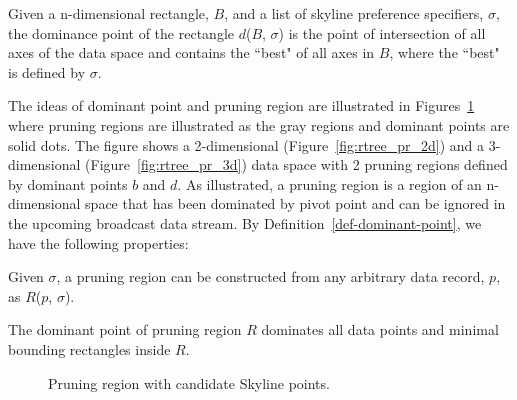 \begin{definition}\label{def-dominant-point}
Given a n-dimensional rectangle, $B$, and a list of skyline preference specifiers, $\sigma$, the dominance point of the rectangle $d$($B$, $\sigma$) is the point of intersection of all axes of the data space and contains the ``best" of all axes in $B$, where the ``best" is defined by $\sigma$.
\end{definition}

The ideas of dominant point and pruning region are illustrated in Figures~\ref{fig:rtree_pr} where pruning regions are illustrated as the gray regions and dominant points are solid dots. The figure shows a 2-dimensional (Figure~\ref{fig:rtree_pr_2d}) and a 3-dimensional (Figure~\ref{fig:rtree_pr_3d}) data space with 2 pruning regions defined by dominant points $b$ and $d$. As illustrated, a pruning region is a region of an n-dimensional space that has been dominated by pivot point and can be ignored in the upcoming broadcast data stream.
By Definition~\ref{def-dominant-point}, we have the following properties:

\begin{property}\label{property:record_pruning}
Given $\sigma$, a pruning region can be constructed from any arbitrary data record, $p$, as $R$($p$, $\sigma$).
\end{property}

\begin{property}\label{property:pivot_point}
The dominant point of pruning region $R$ dominates all data points and minimal bounding rectangles inside $R$.
\end{property}

\begin{figure}[!h]
\centering
{}
\caption{Pruning region with candidate Skyline points.\label{fig:rtree_pr}}
\end{figure}

